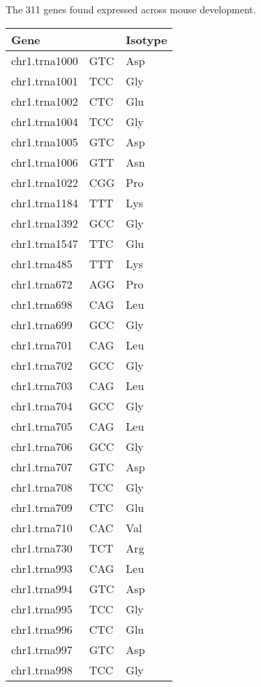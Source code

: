     {The \num{311} \trna genes found expressed across mouse development.}{}

\begin{longtable}{@{}l>{\collectcell\anticodon}l<{\endcollectcell}l@{}}
    \toprule
    Gene & \multicolumn{1}{l}{Isoacceptor} & Isotype \\
    \midrule
    \endhead
    chr1.trna1000 & GTC & Asp \\
    chr1.trna1001 & TCC & Gly \\
    chr1.trna1002 & CTC & Glu \\
    chr1.trna1004 & TCC & Gly \\
    chr1.trna1005 & GTC & Asp \\
    chr1.trna1006 & GTT & Asn \\
    chr1.trna1022 & CGG & Pro \\
    chr1.trna1184 & TTT & Lys \\
    chr1.trna1392 & GCC & Gly \\
    chr1.trna1547 & TTC & Glu \\
    chr1.trna485 & TTT & Lys \\
    chr1.trna672 & AGG & Pro \\
    chr1.trna698 & CAG & Leu \\
    chr1.trna699 & GCC & Gly \\
    chr1.trna701 & CAG & Leu \\
    chr1.trna702 & GCC & Gly \\
    chr1.trna703 & CAG & Leu \\
    chr1.trna704 & GCC & Gly \\
    chr1.trna705 & CAG & Leu \\
    chr1.trna706 & GCC & Gly \\
    chr1.trna707 & GTC & Asp \\
    chr1.trna708 & TCC & Gly \\
    chr1.trna709 & CTC & Glu \\
    chr1.trna710 & CAC & Val \\
    chr1.trna730 & TCT & Arg \\
    chr1.trna993 & CAG & Leu \\
    chr1.trna994 & GTC & Asp \\
    chr1.trna995 & TCC & Gly \\
    chr1.trna996 & CTC & Glu \\
    chr1.trna997 & GTC & Asp \\
    chr1.trna998 & TCC & Gly \\

\end{longtable}
